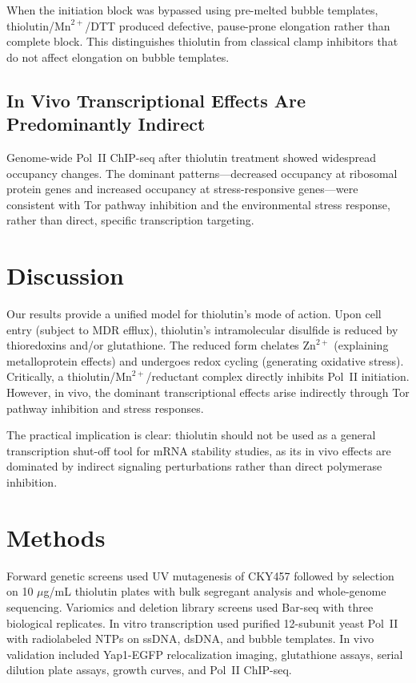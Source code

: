 \documentclass[11pt]{article}
\begin{document}
When the initiation block was bypassed using pre-melted bubble templates, thiolutin/$\text{Mn}^{2+}$/DTT produced defective, pause-prone elongation rather than complete block. This distinguishes thiolutin from classical clamp inhibitors that do not affect elongation on bubble templates.

\subsection{In Vivo Transcriptional Effects Are Predominantly Indirect}

Genome-wide Pol~II ChIP-seq after thiolutin treatment showed widespread occupancy changes. The dominant patterns---decreased occupancy at ribosomal protein genes and increased occupancy at stress-responsive genes---were consistent with Tor pathway inhibition \citep{loewith2002tor} and the environmental stress response, rather than direct, specific transcription targeting.

\section{Discussion}

Our results provide a unified model for thiolutin's mode of action. Upon cell entry (subject to MDR efflux), thiolutin's intramolecular disulfide is reduced by thioredoxins and/or glutathione. The reduced form chelates $\text{Zn}^{2+}$ (explaining metalloprotein effects) and undergoes redox cycling (generating oxidative stress). Critically, a thiolutin/$\text{Mn}^{2+}$/reductant complex directly inhibits Pol~II initiation. However, in vivo, the dominant transcriptional effects arise indirectly through Tor pathway inhibition and stress responses.

The practical implication is clear: thiolutin should not be used as a general transcription shut-off tool for mRNA stability studies, as its in vivo effects are dominated by indirect signaling perturbations rather than direct polymerase inhibition.

\section{Methods}

Forward genetic screens used UV mutagenesis of CKY457 followed by selection on 10 $\mu$g/mL thiolutin plates with bulk segregant analysis and whole-genome sequencing. Variomics and deletion library screens used Bar-seq with three biological replicates. In vitro transcription used purified 12-subunit yeast Pol~II with radiolabeled NTPs on ssDNA, dsDNA, and bubble templates. In vivo validation included Yap1-EGFP relocalization imaging, glutathione assays, serial dilution plate assays, growth curves, and Pol~II ChIP-seq.



\end{document}

